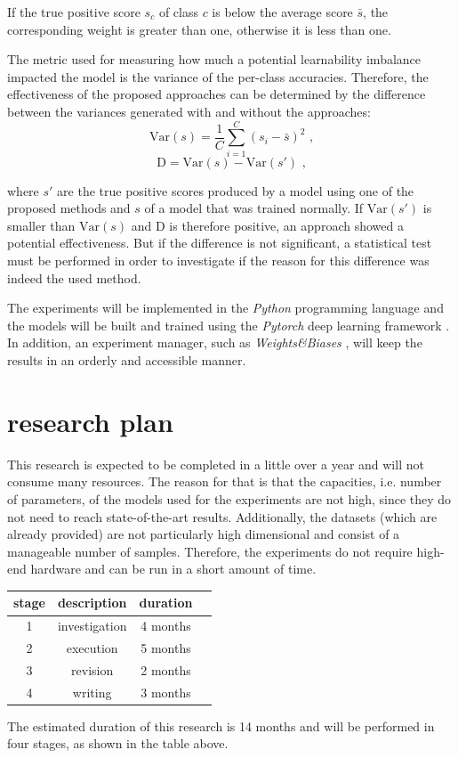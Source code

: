 \documentclass[journal]{IEEEtran}
\begin{document}
If the true positive score $s_c$ of class $c$ is below the average score $\bar{s}$, the corresponding weight is greater than one, otherwise it is less than one.

The metric used for measuring how much a potential learnability imbalance impacted the model is the variance of the per-class accuracies.
Therefore, the effectiveness of the proposed approaches can be determined by the difference between the variances generated with and without the approaches:
\[ \text{Var}(s) = \frac{1}{C} \sum_{i=1}^{C} (s_i - \bar{s})^2 \text{ ,} \tag{6} \]
\[ \text{D} = \text{Var}(s) - \text{Var}(s') \text{ ,} \tag{7} \]

where $s'$ are the true positive scores produced by a model using one of the proposed methods and $s$ of a model that was trained normally. 
If $\text{Var}(s')$ is smaller than $\text{Var}(s)$ and D is therefore positive, an approach showed a potential effectiveness.
But if the difference is not significant, a statistical test must be performed in order to investigate if the reason for this difference was indeed the used method.

The experiments will be implemented in the \emph{Python} programming language \cite{van1995python} and the models will be built and trained using the \emph{Pytorch} deep learning framework \cite{paszke2019pytorch}.
In addition, an experiment manager, such as \emph{Weights\&Biases} \cite{WandB}, will keep the results in an orderly and accessible manner.

\section{research plan}
This research is expected to be completed in a little over a year and will not consume many resources.
The reason for that is that the capacities, i.e. number of parameters, of the models used for the experiments are not high, since they do not need to reach state-of-the-art results.
Additionally, the datasets (which are already provided) are not particularly high dimensional and consist of a manageable number of samples.
Therefore, the experiments do not require high-end hardware and can be run in a short amount of time.

\begin{center}

        \begin{tabular}{ |c|c|c|c| } 
                \hline
                stage & description & duration \\
                \hline
                1 & investigation & 4 months \\ 
                2 & execution & 5 months \\ 
                3 & revision & 2 months \\ 
                4 & writing & 3 months \\
                \hline

        \end{tabular}
\end{center}
The estimated duration of this research is 14 months and will be performed in four stages, as shown in the table above.
\end{document}
